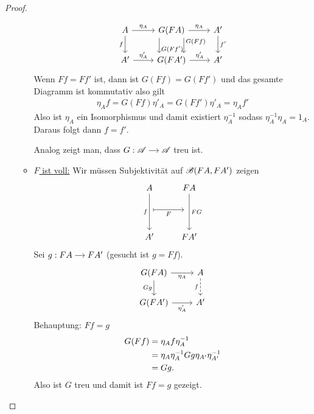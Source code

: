 \begin{proof}
\begin{itemize}
\begin{itemize}
			\[
			\begin{tikzcd} %
			A \arrow[d, "f"'] \arrow[r, "{\eta_A}"]
			& G(FA) \arrow[d, shift left=6, near start, "{G(Ff)}"] \arrow[d, white, "||" marking] \arrow[d, shift right=6, near end, "{G(Ff')}"] \arrow[r, "{\eta_A}"] & A' \arrow[d, "{f'}"]\\
			A' \arrow[r, "{\eta'_A}"]
			& G(FA') \arrow[r, "{\eta'_A}"]
			& A'
			\end{tikzcd}
			\]
			Wenn $Ff = Ff'$ ist, dann ist $G(Ff) = G(Ff')$ und das gesamte Diagramm ist kommutativ also gilt
			\begin{align*}
			\eta_A f = G(Ff)\eta'_A = G(Ff')\eta'_A = \eta_A f'
			\end{align*}
			Also ist $\eta_A$ ein Isomorphismus und damit existiert $\eta^{-1}_A$ sodass $\eta^{-1}_A \eta_A = 1_A$. Daraus folgt dann $f = f'$.
			\begin{bemerkung}
				Analog zeigt man, dass $G: \begin{tikzcd}[cramped, sep=small]
				\CatA \arrow[r] &\CatA
				\end{tikzcd}$ treu ist.
			\end{bemerkung}
			\item \ul{$F$ ist voll:} Wir müssen Subjektivität auf $\mathscr B(FA, FA')$ zeigen
			\[
			\begin{tikzcd}
				A \arrow[dd, "f"'] 
				& FA \arrow[dd, "FG"]\\
				\arrow[r, maps to, "F"'] & \ \\
				A' & FA'
			\end{tikzcd}
			\] 
			Sei $g: \begin{tikzcd}[cramped, sep=small]
			FA \arrow[r] & FA'
			\end{tikzcd}$ (gesucht ist $g = Ff$). %
			\[
			\begin{tikzcd}
				G(FA) \arrow[r, "{\eta_A}"'] \arrow[d, "{Gg}"']
				& A \arrow[d, "{f}"', dashed]\\
				G(FA') \arrow[r, "{\eta'_A}"'] & A'
			\end{tikzcd}
			\]
			Behauptung: $Ff = g$
			\begin{align*}
				G(Ff) &= \eta_A f \eta^{-1}_A\\
				&= \eta_A \eta^{-1}_A Gg \eta_{A'} \eta_{A'}^{-1} \\
				&= Gg.
			\end{align*}
			Also ist $G$ treu und damit ist $Ff = g$ gezeigt.

\end{itemize}
\end{itemize}
\end{proof}
